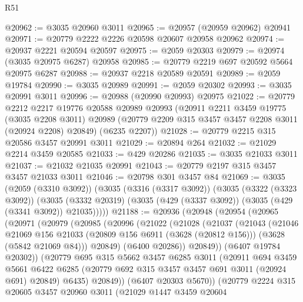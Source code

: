 \begin{lexlean}{R51}
\begin{coremodule}
@20962 := @3035 @20960 @3011
@20965 := @20957 (@20959 @20962) @20941
@20971 := @20779 @2222 @2226 @20598 @20607 @20958 @20962
@20974 := @20937 @2221 @20594 @20597
@20975 := @2059 @20303
@20979 := @20974 (@3035 @20975 @6287) @20958
@20985 := @20779 @2219 @697 @20592 @5664 @20975 @6287
@20988 := @20937 @2218 @20589 @20591
@20989 := @2059 @19784
@20990 := @3035 @20989
@20991 := @2059 @20302
@20993 := @3035 @20991 @3011
@20996 := @20988 (@20990 @20993) @20975
@21022 := @20779
    @2212
    @2217
    @19776
    @20588
    @20989
    @20993
    (@20911
      @2211
      @3459
      @19775
      (@3035 @2208 @3011)
      @20989
      (@20779 @2209 @315 @3457 @3457 @2208 @3011 (@20924 @2208) @20849)
      (@6235 @2207))
@21028 := @20779 @2215 @315 @20586 @3457 @20991 @3011
@21029 := @20894 @264
@21032 := @21029 @2214 @3459 @20585
@21033 := @429 @20286
@21035 := @3035 @21033 @3011
@21037 := @21032 @21035 @20991
@21043 := @20779 @2197 @315 @3457 @3457 @21033 @3011
@21046 := @20798 @301 @3457 @84
@21069 := @3035
    (@2059 (@3310 @3092))
    (@3035
      (@3316 (@3317 @3092))
      (@3035
        (@3322 (@3323 @3092))
        (@3035 (@3332 @20319) (@3035 (@429 (@3337 @3092)) (@3035 (@429 (@3341 @3092)) @21035)))))
@21188 := @20936
    (@20948
      (@20954
        (@20965
          (@20971
            (@20979
              (@20985
                (@20996
                  (@21022
                    (@21028
                      (@21037
                        (@21043
                          (@21046
                            @21069
                            @156
                            @21033
                            (@20809 @156 @6911 (@3628 (@20812 @156)))
                            (@3628 (@5842 @21069 @84)))
                          @20849)
                        (@6400 @20286))
                      @20849))
                  (@6407 @19784 @20302))
                (@20779
                  @695
                  @315
                  @5662
                  @3457
                  @6285
                  @3011
                  (@20911
                    @694
                    @3459
                    @5661
                    @6422
                    @6285
                    (@20779 @692 @315 @3457 @3457 @691 @3011 (@20924 @691) @20849)
                    @6435)
                  @20849))
              (@6407 @20303 @5670))
            (@20779
              @2224
              @315
              @20605
              @3457
              @20960
              @3011
              (@21029
                @1447
                @3459
                @20604

\end{coremodule}
\end{lexlean}

